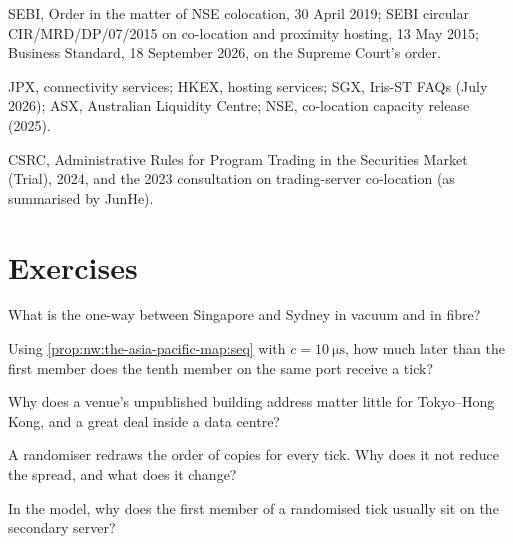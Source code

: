 \begin{omsources}
\item SEBI, Order in the matter of NSE colocation, 30 April 2019; SEBI circular CIR/MRD/DP/07/2015 on co-location and proximity hosting, 13 May
2015; Business Standard, 18 September 2026, on the Supreme Court's order.
\item JPX, connectivity services; HKEX, hosting services; SGX, Iris-ST FAQs (July 2026); ASX, Australian Liquidity Centre; NSE, co-location
capacity release (2025).
\item CSRC, Administrative Rules for Program Trading in the Securities Market (Trial), 2024, and the 2023 consultation on trading-server
co-location (as summarised by JunHe).
\end{omsources}

\section{Exercises}

\begin{exercise}[$\star$]\label{exo:nw:the-asia-pacific-map:1}
What is the one-way  between Singapore and Sydney in vacuum and in fibre?
\end{exercise}

\begin{exercise}[$\star$]\label{exo:nw:the-asia-pacific-map:2}
Using \cref{prop:nw:the-asia-pacific-map:seq} with $c = \qty{10}{\micro\second}$, how much later than the first member does the tenth member on
the same port receive a tick?
\end{exercise}

\begin{exercise}[$\star$]\label{exo:nw:the-asia-pacific-map:3}
Why does a venue's unpublished building address matter little for Tokyo--Hong Kong, and a great deal inside a data centre?
\end{exercise}

\begin{exercise}[$\star\star$]\label{exo:nw:the-asia-pacific-map:4}
A randomiser redraws the order of copies for every tick. Why does it not reduce the spread, and what does it change?
\end{exercise}

\begin{exercise}[$\star\star$]\label{exo:nw:the-asia-pacific-map:5}
In the model, why does the first member of a randomised tick usually sit on the secondary server?
\end{exercise}

